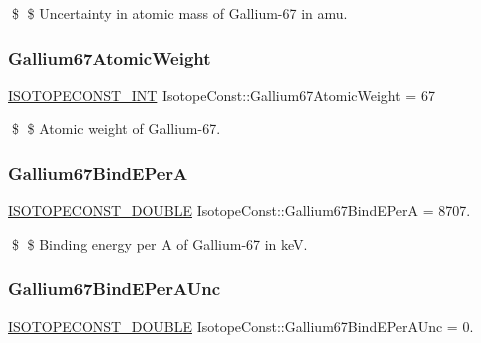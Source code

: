\$ \$ Uncertainty in atomic mass of Gallium-\/67 in amu. \mbox{\label{group___isotope_const-_gallium-_ga67_ga77b9beb8aaa8a63bd0933b9461ef2abd}} 
\subsubsection{\texorpdfstring{Gallium67\+Atomic\+Weight}{Gallium67AtomicWeight}}
{\footnotesize\ttfamily \mbox{\hyperlink{group___isotope_const-_macros_ga5f18360b3e99483a35c32d789e62621c}{I\+S\+O\+T\+O\+P\+E\+C\+O\+N\+S\+T\+\_\+\+I\+NT}} Isotope\+Const\+::\+Gallium67\+Atomic\+Weight = 67}

\$ \$ Atomic weight of Gallium-\/67. \mbox{\label{group___isotope_const-_gallium-_ga67_gaf4c390a88224829ed255075d2a66441a}} 
\subsubsection{\texorpdfstring{Gallium67\+Bind\+E\+PerA}{Gallium67BindEPerA}}
{\footnotesize\ttfamily \mbox{\hyperlink{group___isotope_const-_macros_ga8f45a7272ce02c0b4c65c44636ed719a}{I\+S\+O\+T\+O\+P\+E\+C\+O\+N\+S\+T\+\_\+\+D\+O\+U\+B\+LE}} Isotope\+Const\+::\+Gallium67\+Bind\+E\+PerA = 8707.}

\$ \$ Binding energy per A of Gallium-\/67 in keV. \mbox{\label{group___isotope_const-_gallium-_ga67_ga1763547d2c298477b6e9a4ff47799698}} 
\subsubsection{\texorpdfstring{Gallium67\+Bind\+E\+Per\+A\+Unc}{Gallium67BindEPerAUnc}}
{\footnotesize\ttfamily \mbox{\hyperlink{group___isotope_const-_macros_ga8f45a7272ce02c0b4c65c44636ed719a}{I\+S\+O\+T\+O\+P\+E\+C\+O\+N\+S\+T\+\_\+\+D\+O\+U\+B\+LE}} Isotope\+Const\+::\+Gallium67\+Bind\+E\+Per\+A\+Unc = 0.}

